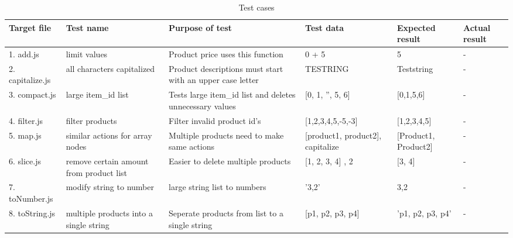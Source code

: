 \documentclass[a4paper, 12pt]{article}
\begin{document}
  
            \begin{table}[h]\caption{Test cases}\label{testTable}
                \begin{tabular}{|p{1.5cm}|p{2cm}|p{4cm}|p{2cm}|p{2cm}|p{1.5cm}|}    \hline
                Target file      & Test name                               & Purpose of test                                            & Test data                                      & Expected result          & Actual result \\ \hline
                1. add.js        & limit values                            & Product price uses this function                           & 0 + 5                                          & 5                        & -             \\ \hline
                2. capitalize.js & all characters capitalized              & Product descriptions must start with an upper case letter  & TESTRING                                       & Teststring               & -             \\ \hline
                3. compact.js    & large item\_id list                     & Tests large item\_id list and deletes unnecessary values   & {[}0, 1, '', 5, 6{]}                           & {[}0,1,5,6{]}            & -             \\ \hline
                4. filter.js     & filter products                         & Filter invalid product id's                                & {[}1,2,3,4,5,-5,-3{]}                          & {[}1,2,3,4,5{]}          & -             \\ \hline
                5. map.js        & similar actions for array nodes         & Multiple products need to make same actions                & {[}product1, product2{]}, capitalize         & {[}Product1, Product2{]} & -             \\ \hline
                6. slice.js      & remove certain amount from product list & Easier to delete multiple products                         & {[}1, 2, 3, 4{]} , 2                           & {[}3, 4{]}               & -             \\ \hline
                7. toNumber.js   & modify string to number                 & large string list to numbers                               & '3,2'                                          & 3,2                      & -             \\ \hline
                8. toString.js   & multiple products into a single string  & Seperate products from list to a single string             & {[}p1, p2, p3, p4{]}                           & 'p1, p2, p3, p4'         & -             \\ \hline

\end{tabular}
\end{table}
\end{document}
